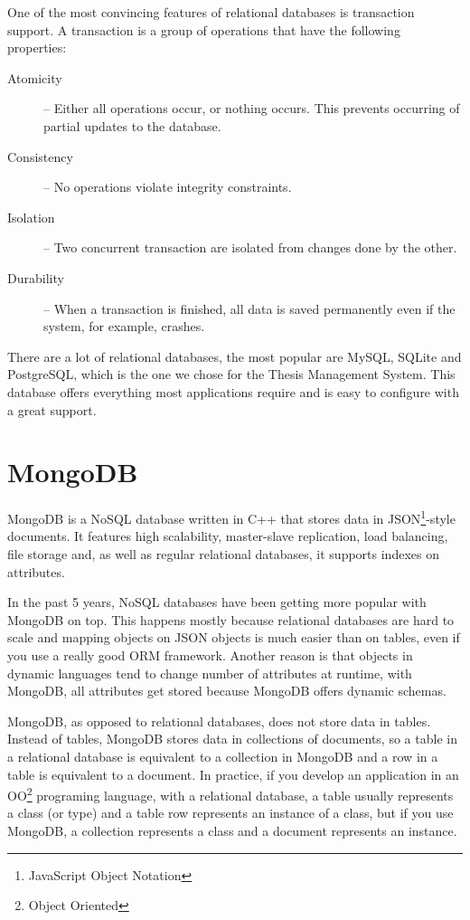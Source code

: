 One of the most convincing features of relational databases is transaction support. A transaction is a group of operations that have the following properties:

\begin{description}
    \item[Atomicity] -- Either all operations occur, or nothing occurs. This prevents occurring of partial updates to the database.
    \item[Consistency] -- No operations violate integrity constraints.
    \item[Isolation] -- Two concurrent transaction are isolated from changes done by the other.
    \item[Durability] -- When a transaction is finished, all data is saved permanently even if the system, for example, crashes.
\end{description}

There are a lot of relational databases, the most popular are MySQL, SQLite and PostgreSQL, which is the one we chose for the Thesis Management System. This database offers everything most applications require and is easy to configure with a great support.

\section{MongoDB}

MongoDB is a NoSQL database written in C++\cite{mongodb-homepage} that stores data in JSON\footnote{JavaScript Object Notation}-style documents. It features high scalability, master-slave replication, load balancing, file storage and, as well as regular relational databases, it supports indexes on attributes. 

In the past 5 years, NoSQL databases have been getting more popular with MongoDB on top\cite{db-ranking}. This happens mostly because relational databases are hard to scale and mapping objects on JSON objects is much easier than on tables, even if you use a really good ORM framework. Another reason is that objects in dynamic languages tend to change number of attributes at runtime, with MongoDB, all attributes get stored because MongoDB offers dynamic schemas.

MongoDB, as opposed to relational databases, does not store data in tables. Instead of tables, MongoDB stores data in collections of documents, so a table in a relational database is equivalent to a collection in MongoDB and a row in a table is equivalent to a document. In practice, if you develop an application in an OO\footnote{Object Oriented} programing language, with a relational database, a table usually represents a class (or type) and a table row represents an instance of a class, but if you use MongoDB, a collection represents a class and a document represents an instance.

